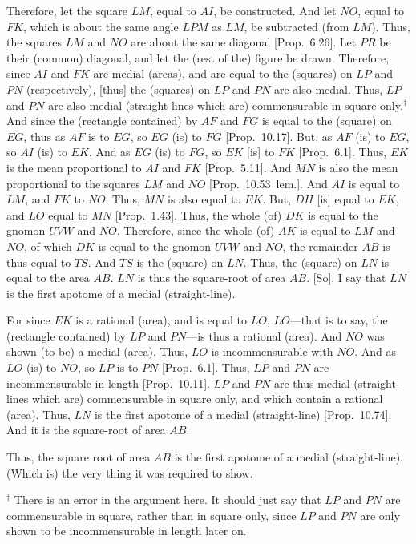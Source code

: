 \begin{Parallel}{}{}
{Therefore, let the square $LM$, equal to $AI$, be constructed.
And let $NO$, equal to $FK$, which is about the
same angle $LPM$ as $LM$, be subtracted (from $LM$).
Thus, the squares $LM$ and $NO$ are about the same diagonal
[Prop.~6.26]. Let $PR$ be their (common) diagonal, and
let the (rest of the) figure be drawn. Therefore, since $AI$ and $FK$
are medial (areas), and are equal to the (squares) on $LP$ and $PN$
(respectively), [thus] the (squares) on $LP$ and $PN$ are also medial.
Thus, $LP$ and $PN$ are  also medial (straight-lines which are)
commensurable in square only.$^\dag$ And since the (rectangle contained) by
$AF$ and $FG$ is equal to the (square) on $EG$, thus as $AF$ is to $EG$, so $EG$ (is) to $FG$ [Prop.~10.17]. But, as
$AF$ (is) to $EG$, so $AI$ (is) to $EK$. And as $EG$ (is) to $FG$, so
$EK$ [is] to $FK$ [Prop.~6.1]. Thus, $EK$ is the mean proportional to $AI$ and $FK$ [Prop.~5.11].
And $MN$ is also the mean proportional to the squares $LM$ and $NO$ [Prop.~10.53~lem.]. 
And $AI$ is equal to $LM$, and $FK$ to $NO$. 
Thus, $MN$ is also equal to
$EK$. But, $DH$ [is] equal to $EK$, and $LO$ equal to $MN$ [Prop.~1.43]. Thus, the whole  (of) $DK$ is equal to
the gnomon $UVW$ and $NO$. Therefore, since the whole (of) $AK$
is equal to $LM$ and $NO$, of which $DK$ is equal to the
gnomon $UVW$ and $NO$,  the remainder $AB$ is thus equal to $TS$.
And $TS$ is the (square) on $LN$. Thus, the (square) on $LN$
is equal to the area $AB$. $LN$ is thus the square-root of area $AB$.
[So], I say that $LN$ is the first apotome of a medial (straight-line).

For since $EK$ is a rational (area), and is equal to $LO$, $LO$---that is to
say, the (rectangle contained) by $LP$ and $PN$---is thus
a rational (area). And $NO$ was shown (to be) a medial (area). Thus,
$LO$ is incommensurable  with $NO$. And as $LO$ (is) to $NO$,
so $LP$ is to $PN$ [Prop.~6.1]. Thus,  $LP$ and
$PN$ are incommensurable in length [Prop.~10.11]. 
$LP$ and $PN$ are thus medial (straight-lines which are) commensurable
in square only, and which contain a rational (area). Thus, $LN$ is the
first apotome of a medial (straight-line) [Prop.~10.74]. And it is the square-root of area $AB$.

Thus, the square root of area $AB$ is the first apotome of a medial (straight-line). (Which is) the very thing it was required to show.}
\end{Parallel}
{\footnotesize\noindent$^\dag$ There is an error in the argument here. It should just say that $LP$ and $PN$ are commensurable in square,
rather than in square only, since $LP$ and $PN$ are only shown
to be incommensurable in length later on.}

